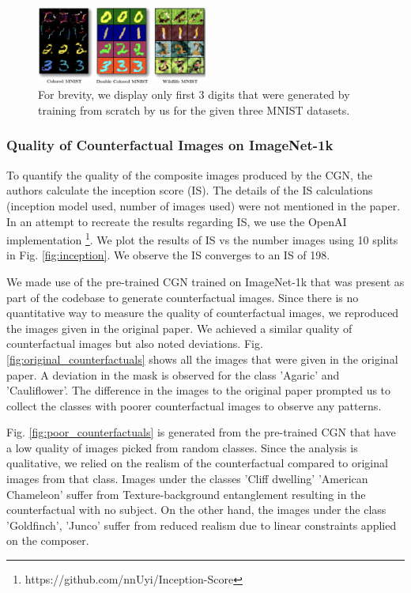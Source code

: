 \begin{figure}[ht!]
  \centering
    \includegraphics[width=0.5\textwidth,height=0.3\textwidth]{../openreview/images/mnist_cfgs/mnist_cfg.png}
    \caption{For brevity, we display only first 3 digits that were generated by training from scratch by us for the given three MNIST datasets.  
    }
    \label{fig:original_counterfactuals_mnist}
\end{figure}


\subsubsection{Quality of Counterfactual Images on ImageNet-1k}

To quantify the quality of the composite images produced by the CGN, the authors calculate the inception score (IS). The details of the IS calculations (inception model used, number of images used) were not mentioned in the paper. In an attempt to recreate the results regarding IS, we use the OpenAI implementation \footnote{https://github.com/nnUyi/Inception-Score}. We plot the results of IS vs the number images using 10 splits in Fig. \ref{fig:inception}. We observe the IS converges to an IS of 198.

We made use of the pre-trained CGN trained on ImageNet-1k that was present as part of the codebase to generate counterfactual images. 
Since there is no quantitative way to measure the quality of counterfactual images, we reproduced the images given in the original paper. We achieved a similar quality of counterfactual images but also noted deviations. 
Fig. \ref{fig:original_counterfactuals} shows all the images that were given in the original paper. A deviation in the mask is observed for the class 'Agaric' and 'Cauliflower'. 
The difference in the images to the original paper prompted us to collect the classes with poorer counterfactual images to observe any patterns. 

Fig. \ref{fig:poor_counterfactuals} is generated from the pre-trained CGN that have a low quality of images picked from random classes. Since the analysis is qualitative, we relied on the realism of the counterfactual compared to original images from that class.
Images under the classes 'Cliff dwelling' 'American Chameleon' suffer from Texture-background entanglement resulting in the counterfactual with no subject. On the other hand, the images under the class 'Goldfinch', 'Junco' suffer from reduced realism due to linear constraints applied on the composer.


